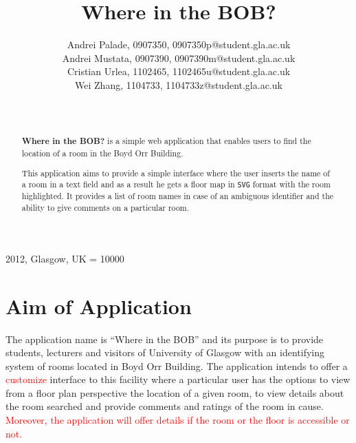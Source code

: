 \documentclass{sig-alt-release2}
\begin{document}
\newcommand{\todo}[1]{\textcolor{red}{#1}}
\def\newblock{\hskip .11em plus .33em minus .07em}

 {2012, Glasgow, UK} 
\widowpenalty = 10000

\title{{Where in the BOB?}}

\author{
Andrei Palade, 0907350, 0907350p@student.gla.ac.uk\\
Andrei Mustata, 0907390, 0907390m@student.gla.ac.uk\\
Cristian Urlea, 1102465, 1102465u@student.gla.ac.uk \\
Wei Zhang, 1104733, 1104733z@student.gla.ac.uk\\
\\
          \\
}

\maketitle

\begin{abstract}

\textbf{Where in the BOB?} is a simple web application that enables users to
find the location of a room in the Boyd Orr Building. 
   
This application aims to provide a simple interface where the user inserts the
name of a room in a text field and as a result he gets a floor map in 
\texttt{SVG} format with the room highlighted. It provides a list of room names
in case of an ambiguous identifier and the ability to give comments on a
particular room. 

\end{abstract}

\section{Aim of Application}

The application name is ``Where in the BOB'' and its purpose is to provide
students, lecturers and visitors of University of Glasgow with an identifying
system of rooms located in Boyd Orr Building. The application intends to
offer a \todo{customize} interface to this facility where a particular user has
the options to view from a floor plan perspective the location of a given room,
to view details about the room searched and provide comments and ratings of
the room in cause. \todo{Moreover, the application will offer details if the
room or the floor is accessible or not.}
\end{document}
